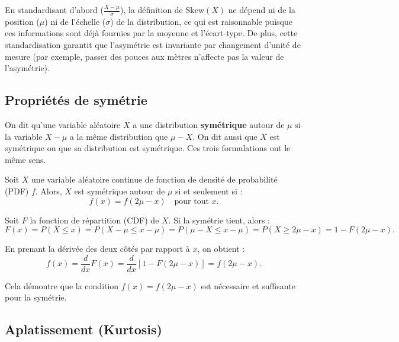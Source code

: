 \begin{remarquebox}
En standardisant d'abord ($\frac{X-\mu}{\sigma}$), la définition de $\text{Skew}(X)$ ne dépend ni de la position ($\mu$) ni de l'échelle ($\sigma$) de la distribution, ce qui est raisonnable puisque ces informations sont déjà fournies par la moyenne et l'écart-type. De plus, cette standardisation garantit que l'asymétrie est invariante par changement d'unité de mesure (par exemple, passer des pouces aux mètres n'affecte pas la valeur de l'asymétrie).
\end{remarquebox}

\subsection{Propriétés de symétrie}

\begin{definitionbox}
On dit qu'une variable aléatoire $X$ a une distribution \textbf{symétrique} autour de $\mu$ si la variable $X - \mu$ a la même distribution que $\mu - X$. On dit aussi que $X$ est symétrique ou que sa distribution est symétrique. Ces trois formulations ont le même sens.
\end{definitionbox}

\begin{theorembox}
Soit $X$ une variable aléatoire continue de fonction de densité de probabilité (PDF) $f$. Alors, $X$ est symétrique autour de $\mu$ si et seulement si :
$$ f(x) = f(2\mu - x) \quad \text{pour tout } x. $$
\end{theorembox}

\begin{proofbox}
Soit $F$ la fonction de répartition (CDF) de $X$. Si la symétrie tient, alors :
$$ F(x) = P(X \le x) = P(X - \mu \le x - \mu) = P(\mu - X \le x - \mu) = P(X \ge 2\mu - x) = 1 - F(2\mu - x). $$

En prenant la dérivée des deux côtés par rapport à $x$, on obtient :
$$ f(x) = \frac{d}{dx}F(x) = \frac{d}{dx}[1 - F(2\mu - x)] = f(2\mu - x). $$

Cela démontre que la condition $f(x) = f(2\mu - x)$ est nécessaire et suffisante pour la symétrie.
\end{proofbox}

\subsection{Aplatissement (Kurtosis)}

